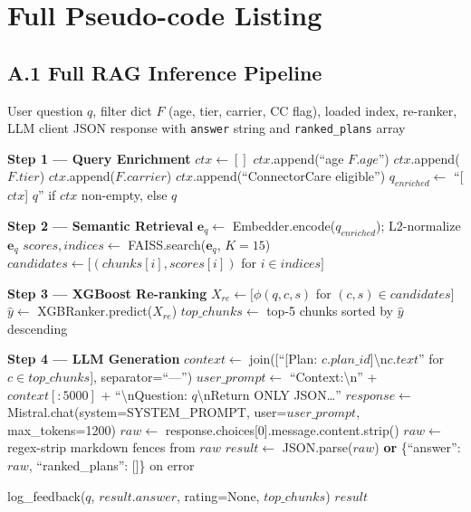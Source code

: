 \documentclass[12pt, letterpaper]{article}
\newenvironment{pseudoblock}[1]{%
  \begin{mdframed}[
    backgroundcolor=pseudobg,
    linecolor=pseudoframe,
    linewidth=1.5pt,
    frametitle={\color{pseudoframe}\bfseries\small Pseudo-code: #1},
    frametitlebackgroundcolor=pseudoframe!15
  ]
  \begin{algorithmic}[1]
}{%
  \end{algorithmic}
  \end{mdframed}
}
\begin{document}
\newpage
\appendix
\renewcommand{\thesection}{Appendix \Alph{section}}

\section{Full Pseudo-code Listing}
\label{app:pseudocode}

\subsection*{A.1 \quad Full RAG Inference Pipeline}

\begin{pseudoblock}{RAG Inference Pipeline --- \texttt{RAGPipeline.query()}}
\REQUIRE User question $q$, filter dict $F$ (age, tier, carrier, CC flag), loaded index, re-ranker, LLM client
\ENSURE JSON response with \texttt{answer} string and \texttt{ranked\_plans} array

\STATE \textbf{Step 1 — Query Enrichment}
\STATE $ctx \gets []$
 $ctx$.append(``age $F.age$'') \ENDIF
{} $ctx$.append($F.tier$) \ENDIF
{} $ctx$.append($F.carrier$) \ENDIF
{} $ctx$.append(``ConnectorCare eligible'') \ENDIF
\STATE $q_{enriched} \gets$ ``[$ctx$] $q$'' if $ctx$ non-empty, else $q$

\STATE \textbf{Step 2 --- Semantic Retrieval}
\STATE $\mathbf{e}_q \gets$ Embedder.encode($q_{enriched}$); L2-normalize $\mathbf{e}_q$
\STATE $scores, indices \gets$ FAISS.search($\mathbf{e}_q$, $K=15$)
\STATE $candidates \gets [(chunks[i], scores[i])$ for $i \in indices]$

\STATE \textbf{Step 3 --- XGBoost Re-ranking}
\STATE $X_{re} \gets [\phi(q, c, s)$ for $(c, s) \in candidates]$
\STATE $\hat{y} \gets$ XGBRanker.predict($X_{re}$)
\STATE $top\_chunks \gets$ top-5 chunks sorted by $\hat{y}$ descending

\STATE \textbf{Step 4 --- LLM Generation}
\STATE $context \gets$ join([``[Plan: $c.plan\_id$]\textbackslash n$c.text$'' for $c \in top\_chunks$], separator=``---'')
\STATE $user\_prompt \gets$ ``Context:\textbackslash n'' + $context[:5000]$ + ``\textbackslash nQuestion: $q$\textbackslash nReturn ONLY JSON\ldots''
\STATE $response \gets$ Mistral.chat(system=SYSTEM\_PROMPT, user=$user\_prompt$, max\_tokens=1200)
\STATE $raw \gets$ response.choices[0].message.content.strip()
\STATE $raw \gets$ regex-strip markdown fences from $raw$
\STATE $result \gets$ JSON.parse($raw$) \textbf{or} \{``answer'': $raw$, ``ranked\_plans'': []\} on error

\STATE log\_feedback($q$, $result.answer$, rating=None, $top\_chunks$)
\RETURN $result$
\end{pseudoblock}
\end{document}
